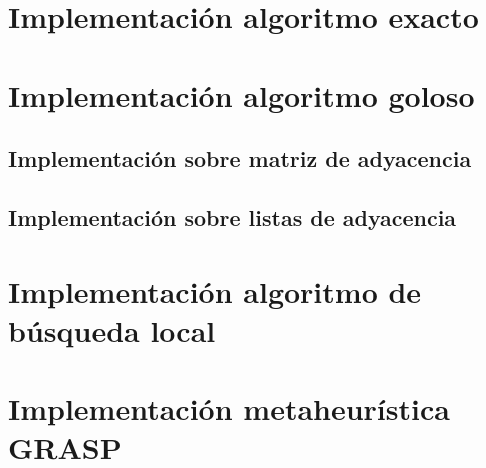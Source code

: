 \newpage
\section{Implementación algoritmo exacto}


\newpage
\section{Implementación algoritmo goloso}

\subsection{Implementación sobre matriz de adyacencia}


\subsection{Implementación sobre listas de adyacencia}


\newpage
\section{Implementación algoritmo de búsqueda local}


\newpage
\section{Implementación metaheurística GRASP}

